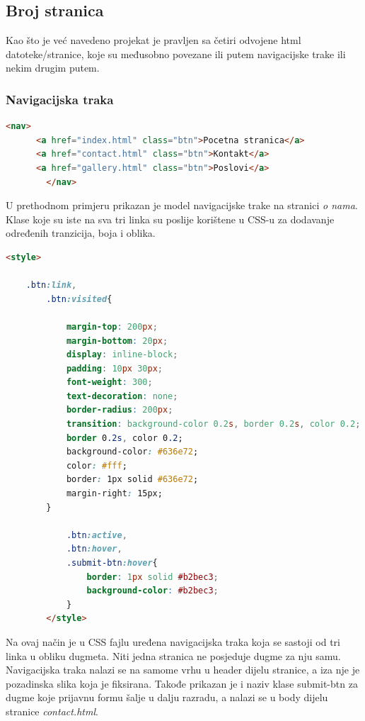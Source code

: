 \documentclass[a4paper]{article}
\begin{document}
\subsection{Broj stranica}
Kao što je već navedeno projekat je pravljen sa četiri odvojene html datoteke/stranice, koje su međusobno povezane ili putem navigacijske trake ili nekim drugim putem.


\subsubsection{Navigacijska traka}

\begin{lstlisting}[language=HTML]
        <nav>
 	  <a href="index.html" class="btn">Pocetna stranica</a>
 	  <a href="contact.html" class="btn">Kontakt</a> 
	  <a href="gallery.html" class="btn">Poslovi</a>
        </nav>
\end{lstlisting}
U prethodnom primjeru prikazan je model navigacijske trake na stranici \emph{o nama}. Klase koje su iste na sva tri linka su poslije korištene u CSS-u za dodavanje određenih tranzicija, boja i oblika. 

\begin{lstlisting}[language=HTML]
        <style>
        
	.btn:link,
        .btn:visited{
        
            margin-top: 200px;
            margin-bottom: 20px;
            display: inline-block;
            padding: 10px 30px;
            font-weight: 300;
            text-decoration: none;
            border-radius: 200px;
            transition: background-color 0.2s, border 0.2s, color 0.2;
            border 0.2s, color 0.2;
            background-color: #636e72;
            color: #fff;
            border: 1px solid #636e72;
            margin-right: 15px;
        }

            .btn:active,
            .btn:hover,
            .submit-btn:hover{
                border: 1px solid #b2bec3;
                background-color: #b2bec3;
            }
        </style>
\end{lstlisting}
Na ovaj način je u CSS fajlu uređena navigacijska traka koja se sastoji od tri linka u obliku dugmeta. Niti jedna stranica ne posjeduje dugme za nju samu. Navigacijska traka nalazi se na samome vrhu u header dijelu stranice, a iza nje je pozadinska slika koja je fiksirana. Takođe prikazan je i naziv klase submit-btn za dugme koje prijavnu formu šalje u dalju razradu, a nalazi se u body dijelu stranice \emph{contact.html}. 
\end{document}

